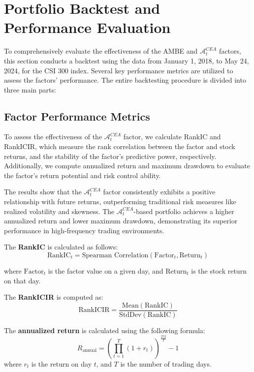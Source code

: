 \documentclass[preprint,12pt,authoryear]{elsarticle}
\begin{document}
\section{Portfolio Backtest and Performance Evaluation}
To comprehensively evaluate the effectiveness of the AMBE and \(\mathcal{A}^{CEA}_t\) factors, this section conducts a backtest using the data from January 1, 2018, to May 24, 2024, for the CSI 300 index. Several key performance metrics are utilized to assess the factors' performance. The entire backtesting procedure is divided into three main parts:

\subsection{Factor Performance Metrics}
To assess the effectiveness of the \(\mathcal{A}^{CEA}_t\) factor, we calculate RankIC and RankICIR, which measure the rank correlation between the factor and stock returns, and the stability of the factor's predictive power, respectively. Additionally, we compute annualized return and maximum drawdown to evaluate the factor's return potential and risk control ability.

The results show that the \(\mathcal{A}^{CEA}_t\) factor consistently exhibits a positive relationship with future returns, outperforming traditional risk measures like realized volatility and skewness. The \(\mathcal{A}^{CEA}_t\)-based portfolio achieves a higher annualized return and lower maximum drawdown, demonstrating its superior performance in high-frequency trading environments.

The \textbf{RankIC} is calculated as follows:
\begin{equation}
    \text{RankIC}_t = \text{Spearman Correlation}(\text{Factor}_t, \text{Return}_t)
\end{equation}

where \(\text{Factor}_t\) is the factor value on a given day, and \(\text{Return}_t\) is the stock return on that day.

The \textbf{RankICIR} is computed as:
\begin{equation}
    \text{RankICIR} = \frac{\text{Mean}(\text{RankIC})}{\text{StdDev}(\text{RankIC})}
\end{equation}

The \textbf{annualized return} is calculated using the following formula:
\begin{equation}
    R_{\text{annual}} = \left( \prod_{t=1}^{T} (1 + r_t) \right)^{\frac{252}{T}} - 1
\end{equation}
where \(r_t\) is the return on day \(t\), and \(T\) is the number of trading days.
\end{document}
